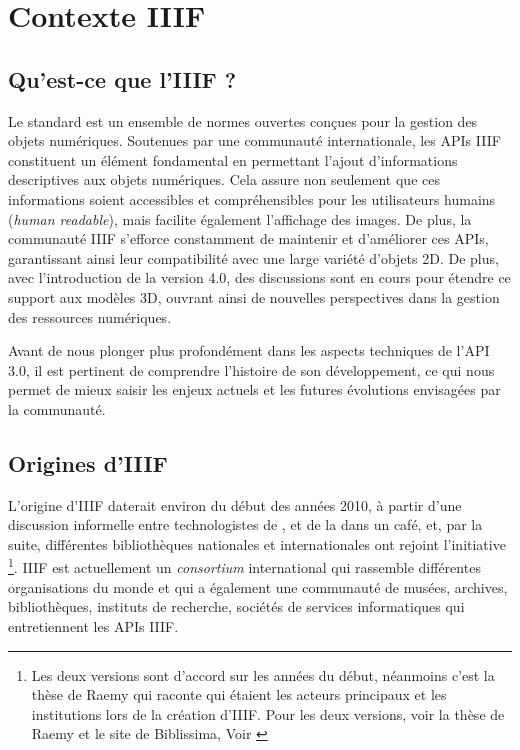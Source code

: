 \chapter{Contexte IIIF}

    \section{Qu'est-ce que l'IIIF ?}
    
    Le standard \iiif est un ensemble de normes ouvertes conçues pour la gestion des objets numériques. Soutenues par une communauté internationale, les APIs IIIF constituent un élément fondamental en permettant l'ajout d'informations descriptives aux objets numériques. Cela assure non seulement que ces informations soient accessibles et compréhensibles pour les utilisateurs humains (\textit{human readable}), mais facilite également l'affichage des images. De plus, la communauté IIIF s'efforce constamment de maintenir et d'améliorer ces APIs, garantissant ainsi leur compatibilité avec une large variété d'objets 2D. De plus, avec l'introduction de la version 4.0, des discussions sont en cours pour étendre ce support aux modèles 3D, ouvrant ainsi de nouvelles perspectives dans la gestion des ressources numériques.
    
    Avant de nous plonger plus profondément dans les aspects techniques de l'API 3.0, il est pertinent de comprendre l'histoire de son développement, ce qui nous permet de mieux saisir les enjeux actuels et les futures évolutions envisagées par la communauté.

    \section{Origines d'IIIF}
    
    L'origine d'IIIF daterait environ du début des années 2010, à partir d'une discussion informelle entre technologistes de ,  et de la  dans un café, et, par la suite, différentes bibliothèques nationales et internationales ont rejoint l'initiative \footnote{Les deux versions sont d'accord sur les années du début, néanmoins c'est la thèse de Raemy qui raconte qui étaient les acteurs principaux et les institutions lors de la création d'IIIF. Pour les deux versions, voir la thèse de Raemy \cite[p.~13]{raemy2017iiif} et le site de Biblissima, Voir \cite{biblissima_iiif_intro}}. IIIF est actuellement un \textit{consortium} international qui rassemble différentes organisations du monde et qui a également une communauté de musées, archives, bibliothèques, instituts de recherche, sociétés de services informatiques qui entretiennent les APIs IIIF.

